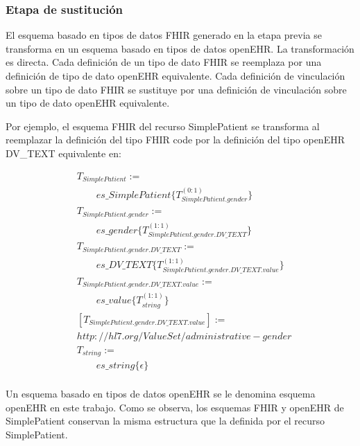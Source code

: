 \subsubsection{Etapa de sustitución}

El esquema basado en tipos de datos FHIR generado en la etapa previa se transforma en un esquema basado en tipos de datos openEHR. La transformación es directa. Cada definición de un tipo de dato FHIR se reemplaza por una definición de tipo de dato openEHR equivalente. Cada definición de vinculación sobre un tipo de dato FHIR se sustituye por una definición de vinculación sobre un tipo de dato openEHR equivalente.

Por ejemplo, el esquema FHIR del recurso SimplePatient se transforma al reemplazar la definición del tipo FHIR code por la definición del tipo openEHR DV\_TEXT equivalente en:

\begin{align*}
&T_{SimplePatient}:= \\
&\qquad es\_SimplePatient\{T_{SimplePatient.gender}^{(0:1)}\} \\
&T_{SimplePatient.gender}:= \\
&\qquad es\_gender\{T_{SimplePatient.gender.DV\_TEXT}^{(1:1)}\} \\
&T_{SimplePatient.gender.DV\_TEXT}:= \\
&\qquad es\_DV\_TEXT\{T_{SimplePatient.gender.DV\_TEXT.value}^{(1:1)}\} \\
&T_{SimplePatient.gender.DV\_TEXT.value}:= \\
&\qquad es\_value\{T_{string}^{(1:1)}\} \\
&[T_{SimplePatient.gender.DV\_TEXT.value}] := \\
& http://hl7.org/ValueSet/administrative-gender \\
&T_{string}:= \\
&\qquad es\_string\{\epsilon\} \\
\end{align*}

Un esquema basado en tipos de datos openEHR se le denomina esquema openEHR en este trabajo. Como se observa, los esquemas FHIR y openEHR de SimplePatient conservan la misma estructura que la definida por el recurso SimplePatient.
